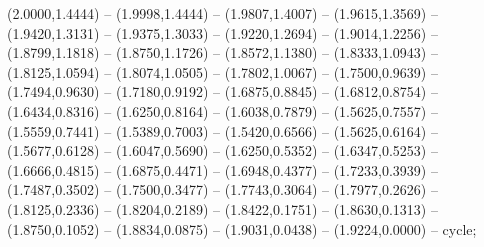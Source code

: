 {(2.0000,1.4444) -- (1.9998,1.4444) -- (1.9807,1.4007) -- (1.9615,1.3569) -- (1.9420,1.3131) -- (1.9375,1.3033) -- (1.9220,1.2694) -- (1.9014,1.2256) -- (1.8799,1.1818) -- (1.8750,1.1726) -- (1.8572,1.1380) -- (1.8333,1.0943) -- (1.8125,1.0594) -- (1.8074,1.0505) -- (1.7802,1.0067) -- (1.7500,0.9639) -- (1.7494,0.9630) -- (1.7180,0.9192) -- (1.6875,0.8845) -- (1.6812,0.8754) -- (1.6434,0.8316) -- (1.6250,0.8164) -- (1.6038,0.7879) -- (1.5625,0.7557) -- (1.5559,0.7441) -- (1.5389,0.7003) -- (1.5420,0.6566) -- (1.5625,0.6164) -- (1.5677,0.6128) -- (1.6047,0.5690) -- (1.6250,0.5352) -- (1.6347,0.5253) -- (1.6666,0.4815) -- (1.6875,0.4471) -- (1.6948,0.4377) -- (1.7233,0.3939) -- (1.7487,0.3502) -- (1.7500,0.3477) -- (1.7743,0.3064) -- (1.7977,0.2626) -- (1.8125,0.2336) -- (1.8204,0.2189) -- (1.8422,0.1751) -- (1.8630,0.1313) -- (1.8750,0.1052) -- (1.8834,0.0875) -- (1.9031,0.0438) -- (1.9224,0.0000) -- cycle;
}
